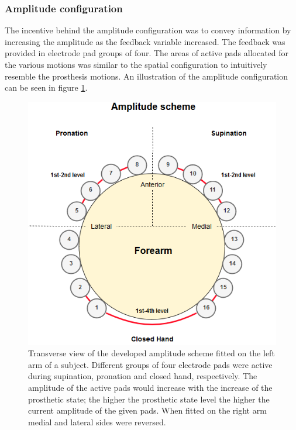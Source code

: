 \subsubsection{Amplitude configuration}
The incentive behind the amplitude configuration was to convey information by increasing the amplitude as the feedback variable increased. The feedback was provided in electrode pad groups of four.
The areas of active pads allocated for the various motions was similar to the spatial configuration to intuitively resemble the prosthesis motions. An illustration of the amplitude configuration can be seen in figure \ref{fig:pa:amplitude}. 
 \begin{figure}[h]                 
	\includegraphics[width=.9\textwidth]{figures/El_array_amplitude}  
	\caption{Transverse view of the developed amplitude scheme fitted on the left arm of a subject. Different groups of four electrode pads were active during supination, pronation and closed hand, respectively. The amplitude of the active pads would increase with the increase of the prosthetic state; the higher the prosthetic state level the higher the current amplitude of the given pads. When fitted on the right arm medial and lateral sides were reversed.}
	\label{fig:pa:amplitude} 
\end{figure}

